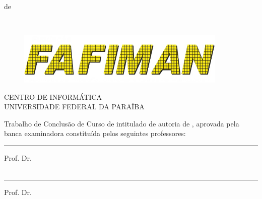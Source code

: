 \documentclass{tcc}
\begin{document}
\vfill
\begin{center}
\MONTH de \the\year
\end{center}

\newpage

$ $
\vfill


\begin{flushright}
\end{flushright}

\newpage

\begin{figure}[H]
\centering
\includegraphics[width=100mm]{imagens/logo3.jpg}
\end{figure}

\begin{center}
CENTRO DE INFORMÁTICA \\
UNIVERSIDADE FEDERAL DA PARAÍBA
\end{center}

\vspace{0.05in}

Trabalho de Conclusão de Curso de \nomedocurso intitulado \textit{\bf \em \thetitle} de autoria de \theauthor, aprovada pela banca examinadora constituída pelos seguintes professores: \\

\vspace{0.7in}

\hrule
\noindent Prof. Dr. \profa\\
\insta\\

\vspace{0.25in}

\hrule
\noindent Prof. Dr. \profb\\
\instb\\

\vspace{0.25in}
\end{document}
